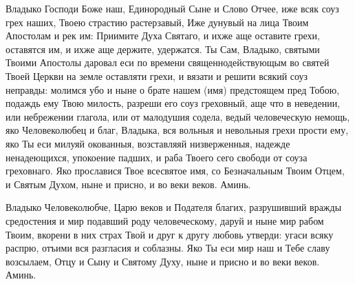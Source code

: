 \mychapterending

\begin{mymulticols}

 

 


Владыко Господи Боже наш, Единородный Сыне и Слово Отчее, иже всяк соуз грех наших, Твоею страстию растерзавый, Иже дунувый на лица Твоим Апостолам и рек им: Приимите Духа Святаго, и ихже аще оставите грехи, оставятся им, и ихже аще держите, удержатся. Ты Сам, Владыко, святыми Твоими Апостолы даровал еси по времени священнодействующым во святей Твоей Церкви на земле оставляти грехи, и вязати и решити всякий соуз неправды: молимся убо и ныне о брате нашем (имя) предстоящем пред Тобою, подаждь ему Твою милость, разреши его соуз греховный, аще что в неведении, или небрежении глагола, или от малодушия содела, ведый человеческую немощь, яко Человеколюбец и благ, Владыка, вся вольныя и невольныя грехи прости ему, яко Ты еси милуяй окованныя, возставляяй низверженныя, надежде ненадеющихся, упокоение падших, и раба Твоего сего свободи от соуза греховнаго. Яко прославися Твое всесвятое имя, со Безначальным Твоим Отцем, и Святым Духом, ныне и присно, и во веки веков. Аминь.

\end{mymulticols}

\mychapterending



\begin{mymulticols}
 
Владыко Человеколюбче, Царю веков и Подателя благих, разрушивший вражды средостения и мир подавший роду человеческому, даруй и ныне мир рабом Твоим, вкорени в них страх Твой и друг к другу любовь утверди: угаси всяку распрю, отъими вся разгласия и соблазны. Яко Ты еси мир наш и Тебе славу возсылаем, Отцу и Сыну и Святому Духу, ныне и присно и во веки веков. Аминь.

\end{mymulticols}

